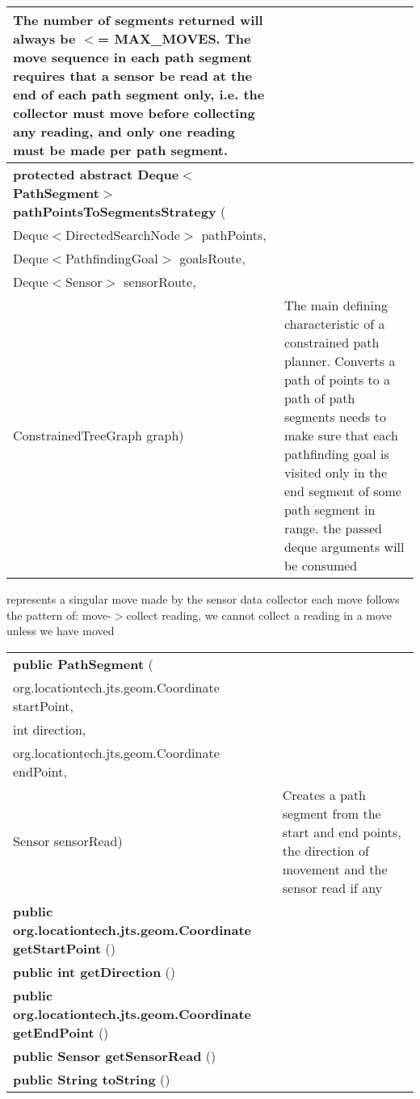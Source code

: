 {\begin{tabular}{ p{3in}|m{3.4in}}
 The number of segments returned will always be $<$= MAX\_MOVES. The move sequence in each path segment requires that a sensor be read at the end of each path segment only, i.e. the collector must move before collecting\newline%
 any reading, and only one reading must be made per path segment.\\ \hline 
\textbf{protected abstract Deque$<$PathSegment$>$ pathPointsToSegmentsStrategy } (\\ \hspace*{ 5pt} Deque$<$DirectedSearchNode$>$ pathPoints,\\\hspace*{ 5pt} Deque$<$PathfindingGoal$>$ goalsRoute,\\\hspace*{ 5pt} Deque$<$Sensor$>$ sensorRoute,\\\hspace*{ 5pt} ConstrainedTreeGraph graph) & The main defining characteristic of a constrained path planner. Converts a path of points to a path of path segments\newline%
 needs to make sure that each pathfinding goal is visited only in the end segment of some path segment in range.\newline%
 the passed deque arguments will be consumed\\ \hline 
\end{tabular}
}
 { represents a singular move made by the sensor data collector\newline%
 each move follows the pattern of: move{-}$>$collect reading, \newline%
 we cannot collect a reading in a move unless we have moved
 
\begin{tabular}{ p{3in}|m{3.4in}}
\textbf{public PathSegment } (\\ \hspace*{ 5pt} org.locationtech.jts.geom.Coordinate startPoint,\\\hspace*{ 5pt} int direction,\\\hspace*{ 5pt} org.locationtech.jts.geom.Coordinate endPoint,\\\hspace*{ 5pt} Sensor sensorRead) & Creates a path segment from the start and end points, the direction of movement and the sensor read if any\\ \hline 
\textbf{public org.locationtech.jts.geom.Coordinate getStartPoint} () & \\ \hline 
\textbf{public int getDirection} () & \\ \hline 
\textbf{public org.locationtech.jts.geom.Coordinate getEndPoint} () & \\ \hline 
\textbf{public Sensor getSensorRead} () & \\ \hline 
\textbf{public String toString} () & \\ \hline 
\end{tabular}
}
